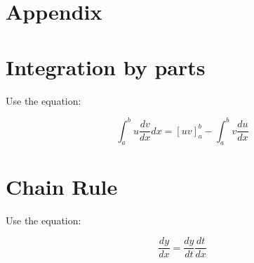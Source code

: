 \documentclass[12pt,onecolumn,tightenlines,aps,amsmath,floatfix,notitlepage,nofootinbib]{revtex4}
\begin{document}


\newpage
\appendix
\section*{Appendix}

\section{Integration by parts} \label{ap-int}

Use the equation:

\[ \int_a^b u \frac{dv}{dx} dx = \left[ uv \right]_a^b - \int_a^b v \frac{du}{dx} \]



\section{Chain Rule} \label{ap-chainrule}

Use the equation:

\[ \frac{dy}{dx} = \frac{dy}{dt} \frac{dt}{dx} \]

\end{document}
